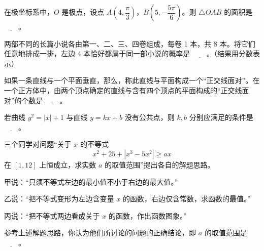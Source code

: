 \begin{question}
在极坐标系中，$O$ 是极点，设点 $A\left(4,\dfrac\pi3\right)$，$B\left(5,-\dfrac{5\pi}6\right)$。则 $\triangle OAB$ 的面积是 $\underline{\qquad}$。

\end{question}
\begin{question}
两部不同的长篇小说各由第一、二、三、四卷组成，每卷 1 本，共 8 本。将它们任意地排成一排，左边 4 本恰好都属于同一部小说的概率是 $\underline{\qquad}$。（结果用分数表示）

\end{question}
\begin{question}
如果一条直线与一个平面垂直，那么，称此直线与平面构成一个“正交线面对”。在一个正方体中，由两个顶点确定的直线与含有四个顶点的平面构成的“正交线面对”的个数是 $\underline{\qquad}$。

\end{question}
\begin{question}
若曲线 $y^2=|x|+1$ 与直线 $y=kx+b$ 没有公共点，则 $k,b$ 分别应满足的条件是 $\underline{\qquad}$。

\end{question}
\begin{question}
三个同学对问题“关于 $x$ 的不等式
\nopagebreak[4]
\[
x^2+25+|x^3-5x^2|\ge ax
\]
在 $[1,12]$ 上恒成立，求实数 $a$ 的取值范围”提出各自的解题思路。

甲说：“只须不等式左边的最小值不小于右边的最大值。”

乙说：“把不等式变形为左边含变量 $x$ 的函数，右边仅含常数，求函数的最值。”

丙说：“把不等式两边看成关于 $x$ 的函数，作出函数图象。”

参考上述解题思路，你认为他们所讨论的问题的正确结论，即 $a$ 的取值范围是 $\underline{\qquad}$。

\end{question}

